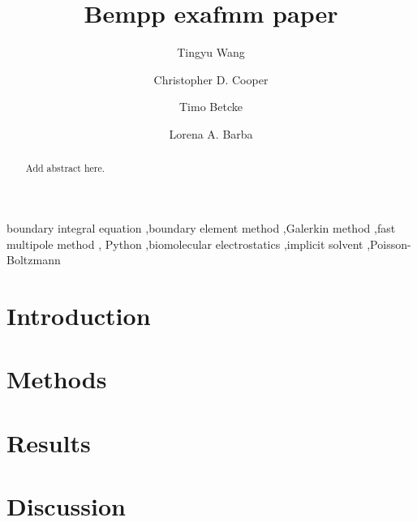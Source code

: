 \documentclass[final,5p,times,twocolumn]{elsarticle}
\begin{document}
\begin{frontmatter}
\title{Bempp exafmm paper}

\author[gwu]{Tingyu Wang}

\author[usm]{Christopher D. Cooper}

\author[ucl]{Timo Betcke}

\author[gwu]{Lorena A. Barba}

\address[gwu]{Department of Mechanical and Aerospace Engineering, The George Washington University, Washington DC}
\address[usm]{Department of Mechanical Engineering, Universidad T\'ecnica Federico Santa Mar\'ia, Valpara\'iso, Chile}
\address[ucl]{Department of Mathematics, University College London, UK}

\begin{abstract}
    Add abstract here.
\end{abstract}

\begin{keyword}
    boundary integral equation \sep boundary element method \sep Galerkin method \sep fast multipole method \sep
    Python \sep biomolecular electrostatics \sep implicit solvent \sep Poisson-Boltzmann
\end{keyword}

\end{frontmatter}

\section{Introduction}\label{sec:intro}


\section{Methods}\label{sec:methods}


\section{Results}\label{sec:results}


\section{Discussion} \label{sec:discussion}

\end{document}
